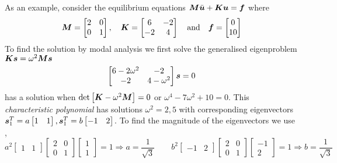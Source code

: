 As an example, consider the equilibrium equations $\matr{M}\ddot{\vect{u}} +
\matr{K}\vect{u}=\vect{f}$ where
\begin{displaymath}
 \matr{M}=\begin{bmatrix}
   2 & 0 \\
   0 & 1
 \end{bmatrix}, \quad
 \matr{K}=\begin{bmatrix}
   6 & -2 \\
   -2 & 4
 \end{bmatrix}\quad\text{and}\quad
 \vect{f}=\begin{bmatrix}
   0 \\
   10
 \end{bmatrix}
\end{displaymath}
To find the solution by modal analysis we first solve the generalised
eigenproblem $\matr{K}\vect{s} = \omega^{2}\matr{M}\vect{s}$ \ie
\begin{displaymath}
  \begin{bmatrix}
   6-2\omega^{2} & -2 \\
   -2 & 4-\omega^{2}
 \end{bmatrix}\vect{s}=0
\end{displaymath}   
has a solution when $\det \sqbrac{\matr{K}-\omega^{2}\matr{M}} = 0$ or $\omega^{4} -
7\omega^{2} + 10= 0$. This \emph{characteristic polynomial} has solutions
$\omega^{2} = 2,5$ with corresponding eigenvectors $\transpose{\vect{s}}_{1} = a
\begin{bmatrix} 1 & 1 \end{bmatrix},\transpose{\vect{s}}_{1} =
b\begin{bmatrix} -1 & 2 \end{bmatrix}$. To find the magnitude of the
eigenvectors we use , \ie
\begin{displaymath}
  a^{2}\begin{bmatrix} 1 & 1 \end{bmatrix}
  \begin{bmatrix}
    2 & 0 \\
    0 & 1
  \end{bmatrix} 
  \begin{bmatrix}
     1 \\
     1
  \end{bmatrix}
  = 1 \Rightarrow a=\dfrac{1}{\sqrt{3}} \qquad b^{2}
  \begin{bmatrix} -1 & 2 \end{bmatrix} 
  \begin{bmatrix}
    2 & 0 \\
    0 & 1
  \end{bmatrix} \begin{bmatrix}
    -1 \\
    2
  \end{bmatrix}=1 \Rightarrow b=\dfrac{1}{\sqrt{3}}
\end{displaymath}

